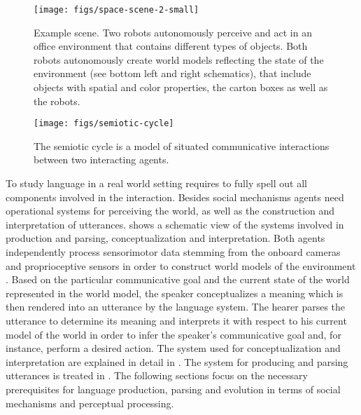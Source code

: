 \begin{figure}
	\begin{center}
		\texttt{[image: figs/space-scene-2-small]}
	\end{center}
	\caption[Example spatial setup]{Example scene. 
		Two robots autonomously perceive and act in an office 
		environment that contains different types of objects. Both 
		robots autonomously create world models reflecting the state 
		of the environment (see bottom left and right schematics), that 
		include objects with spatial and color properties, the carton boxes 
		as well as the robots.}
	\label{f:scene}
\end{figure}
\begin{figure}
\begin{center}
\texttt{[image: figs/semiotic-cycle]}
\caption[Semiotic cycle]{The semiotic cycle is a model of situated communicative interactions between 
two interacting agents.}
\end{center}
\label{f:semiotic-cycle}
\end{figure}

To study language in a real world  setting requires to fully spell out 
all components involved in the interaction.
Besides social mechanisms agents need operational systems for perceiving
the world, as well as the construction and interpretation of utterances. 
 shows a schematic view of the systems
involved in production and parsing, conceptualization and interpretation. 
Both agents independently process sensorimotor data stemming from
the onboard cameras and proprioceptive sensors in order to construct 
world models of the environment 
\citep{spranger2008grounded,spranger2012perception}. 
Based on the particular communicative goal and the current state of the 
world represented in the world model, the speaker conceptualizes a meaning 
which is then rendered into an utterance by the language system. 
The hearer parses the utterance to determine its meaning and 
interprets it with respect to his current model of the world in order 
to infer the speaker's communicative goal and, for instance, 
perform a desired action. The system used for conceptualization
and interpretation are explained in detail in .
The system for producing and parsing utterances is treated in
. 
The following sections focus on the necessary prerequisites for 
language production, parsing and evolution in terms of social mechanisms and 
perceptual processing.

